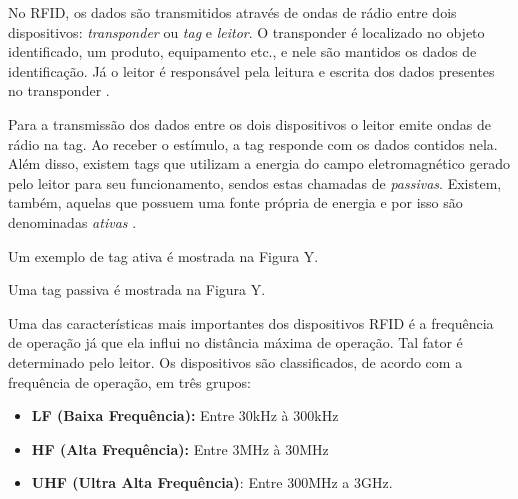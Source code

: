 No RFID, os dados são transmitidos através de ondas de rádio entre dois dispositivos: \textit{transponder} ou \textit{tag} e \textit{leitor}. O transponder é localizado no objeto identificado, um produto, equipamento etc., e nele são mantidos os dados de identificação. Já o leitor é responsável pela leitura e escrita dos dados presentes no transponder \cite{Finkenzeller2010}.

Para a transmissão dos dados entre os dois dispositivos o leitor emite ondas de rádio na tag. Ao receber o estímulo, a tag responde com os dados contidos nela. Além disso, existem tags que utilizam a energia do campo eletromagnético gerado pelo leitor para seu funcionamento, sendos estas chamadas de \textit{passivas}. Existem, também, aquelas que possuem uma fonte própria de energia e por isso são denominadas \textit{ativas} \cite{Finkenzeller2010}.

Um exemplo de tag ativa é mostrada na Figura Y.


Uma tag passiva é mostrada na Figura Y.




Uma das características mais importantes dos dispositivos RFID é a frequência de operação já que ela influi no distância máxima de operação. Tal fator é determinado pelo leitor. Os dispositivos são classificados, de acordo com a frequência de operação, em três grupos:

\begin{itemize} \parskip -4pt
	\item \textbf{LF (Baixa Frequência):} Entre 30kHz à 300kHz
	\item \textbf{HF (Alta Frequência):} Entre 3MHz à 30MHz
	\item \textbf{UHF (Ultra Alta Frequência)}: Entre 300MHz a 3GHz.
\end{itemize}

